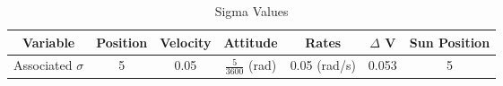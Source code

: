 \begin{table}[htbp]
    \caption{Sigma Values}
\label{tab:sigmas}
    \centering \fontsize{10}{10}\selectfont
\begin{tabular}{|c||c|c|c|c|c|c|}
\hline
Variable & Position & Velocity & Attitude & Rates & $\Delta$ V & Sun Position \\ \hline \hline
Associated $\sigma$ & 5 & 0.05 & $\frac{5}{3600}$ (rad) & 0.05 (rad/s) & 0.053 & 5 \\ \hline 
\end{tabular}
\end{table}

